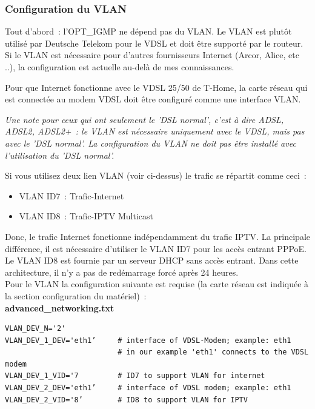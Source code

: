 \subsubsection{Configuration du VLAN}

Tout d'abord~: l'OPT\_IGMP ne dépend pas du VLAN. Le VLAN est plutôt utilisé par Deutsche
Telekom pour le VDSL et doit être supporté par le routeur. Si le VLAN est nécessaire pour
d'autres fournisseurs Internet (Arcor, Alice, etc ..), la configuration est actuelle au-delà
de mes connaissances.

Pour que Internet fonctionne avec le VDSL 25/50 de T-Home, la carte réseau qui est connectée
au modem VDSL doit être configuré comme une interface VLAN.

\vspace{3mm}
\emph{Une note pour ceux qui ont seulement le 'DSL normal', c'est à dire ADSL, ADSL2,
	ADSL2+~: le VLAN est nécessaire uniquement avec le VDSL, mais pas avec le 'DSL normal'.
	La configuration du VLAN ne doit pas être installé avec l'utilisation du 'DSL normal'.}
\vspace{3mm}

Si vous utilisez deux lien VLAN (voir ci-dessus) le trafic se répartit comme ceci~:

\begin{itemize}
   \item{VLAN ID7~: Trafic-Internet}
   \item{VLAN ID8~: Trafic-IPTV Multicast}
\end{itemize}

Donc, le trafic Internet fonctionne indépendamment du trafic IPTV. La principale différence,
il est nécessaire d'utiliser le VLAN ID7 pour les accès entrant PPPoE. Le VLAN ID8 est fournie
par un serveur DHCP sans accès entrant. Dans cette architecture, il n'y a pas de redémarrage
forcé après 24 heures.\\ 

Pour le VLAN la configuration suivante est requise (la carte réseau est indiquée à la section
configuration du matériel)~:\\

\noindent \textbf{advanced\_networking.txt}

\begin{example}
\begin{verbatim}
VLAN_DEV_N='2'
VLAN_DEV_1_DEV='eth1’     # interface of VDSL-Modem; example: eth1
                          # in our example 'eth1' connects to the VDSL modem
VLAN_DEV_1_VID='7         # ID7 to support VLAN for internet
VLAN_DEV_2_DEV='eth1’     # interface of VDSL modem; example: eth1
VLAN_DEV_2_VID='8’        # ID8 to support VLAN for IPTV
\end{verbatim}
\end{example}

